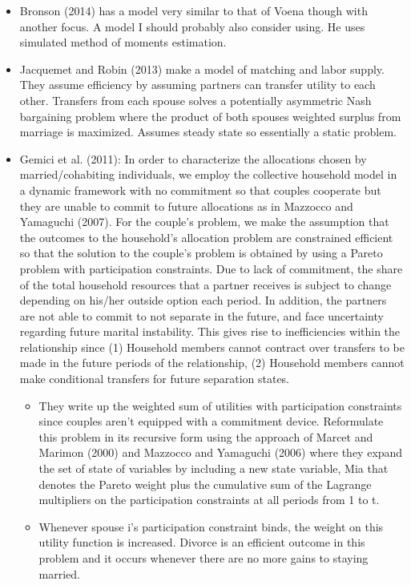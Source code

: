 \begin{itemize}
\begin{itemize}
\begin{itemize}
\end{itemize}
\item 
\end{itemize}
\item Bronson (2014) has a model very similar to that of Voena though with another focus. A model I should probably also consider using. He uses simulated method of moments estimation.
\item Jacquemet and Robin (2013) make a model of matching and labor supply. They assume efficiency by assuming partners can transfer utility to each other. Transfers from each spouse solves a potentially asymmetric Nash bargaining problem where the product of both spouses weighted surplus from marriage is maximized. Assumes steady state so essentially a static problem.
\item Gemici et al. (2011): In order to characterize the allocations chosen by married/cohabiting individuals, we employ the collective household model in a dynamic framework with no commitment so that couples cooperate but they are unable to commit to future allocations as in Mazzocco and Yamaguchi (2007). For the couple’s
problem, we make the assumption that the outcomes to the household’s allocation problem are constrained efficient so that the solution to the couple’s problem is obtained by using a Pareto problem with participation constraints. Due to lack of commitment, the share of the total household resources that a partner receives is subject to change depending on his/her outside option each period. In addition, the partners are not able to commit to not separate in the future, and face uncertainty regarding future marital instability. This gives rise to inefficiencies within the relationship since (1) Household members cannot contract over transfers to be made in the
future periods of the relationship, (2) Household members cannot make conditional transfers for future separation states.
\begin{itemize}
\item They write up the weighted sum of utilities with participation constraints since couples aren't equipped with a commitment device. Reformulate this problem in its recursive form using the approach of Marcet and Marimon (2000) and Mazzocco and Yamaguchi (2006) where they expand the set of state of variables by
including a new state variable, Mia that denotes the Pareto weight plus the cumulative sum of the Lagrange multipliers on the participation constraints at all periods from 1 to t.
\item Whenever spouse i’s participation constraint binds, the weight on this utility function is increased. Divorce is an efficient outcome in this problem and it occurs whenever there are no more gains to staying married.

\end{itemize}
\end{itemize}
